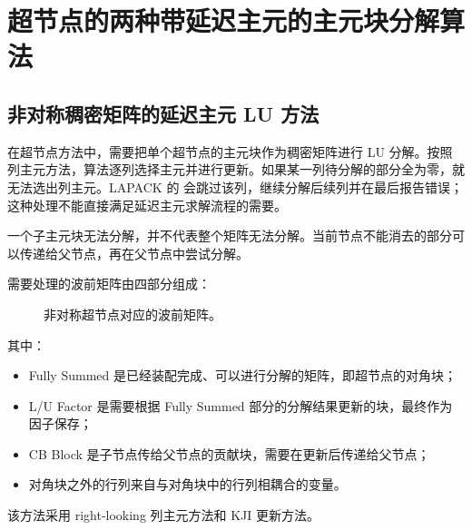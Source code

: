 \chapter{超节点的两种带延迟主元的主元块分解算法}

\section{非对称稠密矩阵的延迟主元 LU 方法}

在超节点方法中，需要把单个超节点的主元块作为稠密矩阵进行 LU 分解。按照列主元方法，算法逐列选择主元并进行更新。如果某一列待分解的部分全为零，就无法选出列主元。LAPACK 的  会跳过该列，继续分解后续列并在最后报告错误；这种处理不能直接满足延迟主元求解流程的需要。

一个子主元块无法分解，并不代表整个矩阵无法分解。当前节点不能消去的部分可以传递给父节点，再在父节点中尝试分解。

需要处理的波前矩阵由四部分组成：

\begin{figure}[htbp]
\centering
{}
\caption{非对称超节点对应的波前矩阵。}
\label{fig:appendix-a-unsym-front}
\end{figure}

其中：

\begin{itemize}
  \item Fully Summed 是已经装配完成、可以进行分解的矩阵，即超节点的对角块；
  \item L/U Factor 是需要根据 Fully Summed 部分的分解结果更新的块，最终作为因子保存；
  \item CB Block 是子节点传给父节点的贡献块，需要在更新后传递给父节点；
  \item 对角块之外的行列来自与对角块中的行列相耦合的变量。
\end{itemize}

该方法采用 right-looking 列主元方法和 KJI 更新方法。

